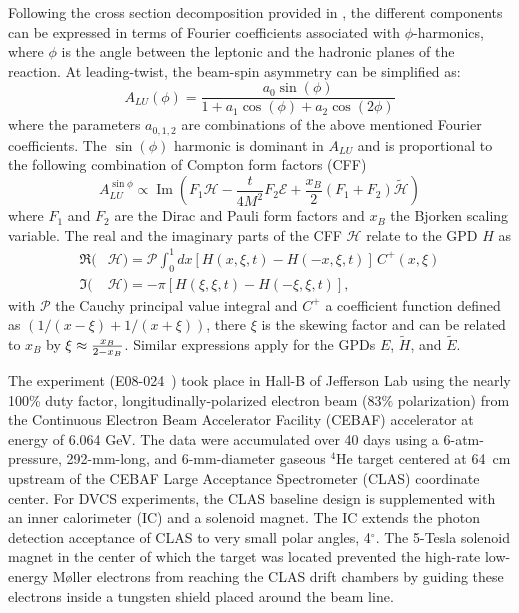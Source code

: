 \documentclass[twocolumn,nofootinbib,showpacs,prl,superscriptaddress,secnumarabic,amssymb,nobibnotes,aps,floatfix]{revtex4}
\begin{document}
Following the cross section decomposition provided in \cite{Belitsky:2001ns}, 
the different components can be expressed in terms of Fourier coefficients 
associated with $\phi$-harmonics, where $\phi$ is the angle between the 
leptonic and the hadronic planes of the reaction. At leading-twist, the 
beam-spin asymmetry can be simplified as: 
\begin{equation}
   A_{LU}(\phi) = \frac{a_{0}\sin(\phi)}{1+a_{1}\cos(\phi)+a_{2}\cos(2\phi)}
   \label{eq:alu-simp}
\end{equation}
where the parameters $a_{0,1,2}$ are combinations of the above mentioned Fourier 
coefficients. The $\sin(\phi)$ harmonic is dominant in $A_{LU}$ 
and is proportional to the following combination of Compton form factors (CFF) 
\cite{Guidal:2013rya}
\begin{equation}
   A_{LU}^{\sin\phi} \propto \operatorname{Im}( F_1 \mathcal{H}- \frac{t}{4M^2} 
   F_2 \mathcal{E}+ \frac{x_B}{2}(F_1+F_2)\tilde{\mathcal{H}})
\end{equation}
where $F_1$ and $F_2$ are the Dirac and Pauli form factors and $x_B$ the 
Bjorken scaling variable. The real and the imaginary parts of the CFF 
$\mathcal{H}$ relate to the GPD $H$ as  
\begin{align}
   \Re(&\mathcal{H}) = \mathcal{P} \int_{0}^{1}dx[H(x,\xi,t)-H(-x,\xi,t)] \, 
   C^{+}(x,\xi) \\
   \Im(&\mathcal{H}) = - \pi [H(\xi,\xi,t)-H(-\xi,\xi,t)],
\end{align}
with $\mathcal{P}$ the Cauchy principal value integral and $C^{+}$ a 
coefficient function defined as $(1/(x-\xi) + 1/(x+\xi))$, there $\xi$ is the 
skewing factor and can be
related to $x_B$ by $\xi\approx {{x_B}\over{2-x_B}}$. Similar expressions apply 
for the GPDs $E$, $\widetilde{H}$, and $\widetilde{E}$.


The experiment (E08-024~\cite{Hafidi:2008pr}) took place in Hall-B of Jefferson 
Lab using the nearly 100\% duty factor, longitudinally-polarized electron beam 
(83$\%$ polarization) from the Continuous Electron Beam Accelerator Facility 
(CEBAF) accelerator at energy of 6.064 GeV. The data were accumulated 
over 40 days using a 6-atm-pressure, 292-mm-long, and 6-mm-diameter gaseous 
$^4$He target centered at 64~cm upstream of the CEBAF Large Acceptance 
Spectrometer (CLAS) coordinate center. For DVCS experiments, the CLAS baseline 
design \cite{Mecking:2003zu} 
is supplemented with an inner calorimeter (IC) and a solenoid magnet. The IC extends 
the photon detection acceptance of CLAS to very small polar angles, 4$^{\circ}$. 
The 5-Tesla solenoid magnet in the center of which the target was located 
prevented the high-rate low-energy M{\o}ller electrons from reaching the CLAS 
drift chambers by guiding these electrons inside a tungsten shield placed around the beam line. 
\end{document}
